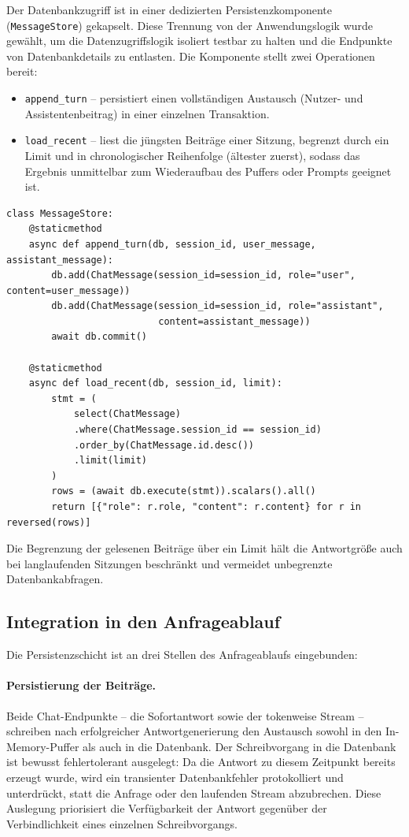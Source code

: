 \documentclass[11pt,a4paper]{article}
\begin{document}
Der Datenbankzugriff ist in einer dedizierten Persistenzkomponente
(\texttt{MessageStore}) gekapselt. Diese Trennung von der Anwendungslogik wurde
gewählt, um die Datenzugriffslogik isoliert testbar zu halten und die Endpunkte von
Datenbankdetails zu entlasten. Die Komponente stellt zwei Operationen bereit:

\begin{itemize}
  \item \texttt{append\_turn} -- persistiert einen vollständigen Austausch
        (Nutzer- und Assistentenbeitrag) in einer einzelnen Transaktion.
  \item \texttt{load\_recent} -- liest die jüngsten Beiträge einer Sitzung,
        begrenzt durch ein Limit und in chronologischer Reihenfolge
        (ältester zuerst), sodass das Ergebnis unmittelbar zum Wiederaufbau des
        Puffers oder Prompts geeignet ist.
\end{itemize}

\begin{verbatim}
class MessageStore:
    @staticmethod
    async def append_turn(db, session_id, user_message, assistant_message):
        db.add(ChatMessage(session_id=session_id, role="user", content=user_message))
        db.add(ChatMessage(session_id=session_id, role="assistant",
                           content=assistant_message))
        await db.commit()

    @staticmethod
    async def load_recent(db, session_id, limit):
        stmt = (
            select(ChatMessage)
            .where(ChatMessage.session_id == session_id)
            .order_by(ChatMessage.id.desc())
            .limit(limit)
        )
        rows = (await db.execute(stmt)).scalars().all()
        return [{"role": r.role, "content": r.content} for r in reversed(rows)]
\end{verbatim}

Die Begrenzung der gelesenen Beiträge über ein Limit hält die Antwortgröße auch bei
langlaufenden Sitzungen beschränkt und vermeidet unbegrenzte Datenbankabfragen.

\subsection{Integration in den Anfrageablauf}

Die Persistenzschicht ist an drei Stellen des Anfrageablaufs eingebunden:

\paragraph{Persistierung der Beiträge.} Beide Chat-Endpunkte -- die
Sofortantwort sowie der tokenweise Stream -- schreiben nach erfolgreicher
Antwortgenerierung den Austausch sowohl in den In-Memory-Puffer als auch in die
Datenbank. Der Schreibvorgang in die Datenbank ist bewusst fehlertolerant
ausgelegt: Da die Antwort zu diesem Zeitpunkt bereits erzeugt wurde, wird ein
transienter Datenbankfehler protokolliert und unterdrückt, statt die Anfrage
oder den laufenden Stream abzubrechen. Diese Auslegung priorisiert die
Verfügbarkeit der Antwort gegenüber der Verbindlichkeit eines einzelnen
Schreibvorgangs.
\end{document}
